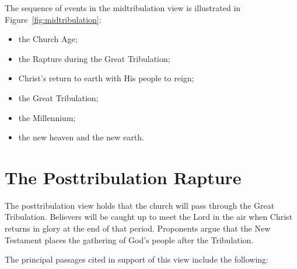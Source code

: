 The sequence of events in the midtribulation view is illustrated in Figure~\ref{fig:midtribulation}: 
\begin{itemize}
\item[\ding{172} ] the Church Age; 
\item[\ding{173} ] the Rapture during the Great Tribulation;
\item[\ding{174} ] Christ's return to earth with His people to reign;
\item[\ding{175} ] the Great Tribulation; 
\item[\ding{176} ] the Millennium;
\item[\ding{177} ] the new heaven and the new earth.
\end{itemize}


\section*{The Posttribulation Rapture}

The posttribulation view holds that the church will pass through the Great Tribulation. Believers will be caught up to meet the Lord in the air when Christ returns in glory at the end of that period. Proponents argue that the New Testament places the gathering of God's people after the Tribulation.

The principal passages cited in support of this view include the following:

